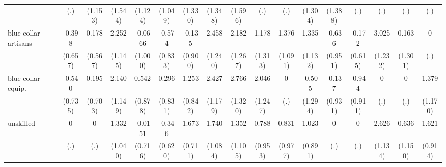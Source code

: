 {\begin{tabular}{l*{16}{c}}
                    &         (.)         &     (1.153)         &     (1.544)         &     (1.124)         &     (1.049)         &     (1.330)         &     (1.348)         &     (1.596)         &         (.)         &         (.)         &     (1.304)         &     (1.388)         &         (.)         &         (.)         &         (.)         &         (.)         \\
[1em]
blue collar - artisans&      -0.398         &       0.178         &       2.252\sym{*}  &     -0.0666         &      -0.574         &      -0.135         &       2.458\sym{*}  &       2.182         &       1.178         &       1.376         &       1.335         &      -0.636         &      -0.172         &       3.025\sym{*}  &       0.163         &           0         \\
                    &     (0.657)         &     (0.567)         &     (1.145)         &     (1.000)         &     (0.833)         &     (0.900)         &     (1.240)         &     (1.267)         &     (1.313)         &     (1.091)         &     (1.132)         &     (0.951)         &     (0.615)         &     (1.232)         &     (1.301)         &         (.)         \\
[1em]
blue collar - equip.&      -0.540         &       0.195         &       2.140         &       0.542         &       0.296         &       1.253         &       2.427\sym{*}  &       2.766\sym{*}  &       2.046         &           0         &      -0.505         &      -0.137         &      -0.944         &           0         &           0         &       1.379         \\
                    &     (0.735)         &     (0.703)         &     (1.149)         &     (0.878)         &     (0.831)         &     (0.842)         &     (1.179)         &     (1.320)         &     (1.247)         &         (.)         &     (1.294)         &     (0.931)         &     (0.911)         &         (.)         &         (.)         &     (1.170)         \\
[1em]
unskilled           &           0         &           0         &       1.332         &     -0.0151         &      -0.346         &       1.673\sym{*}  &       1.740         &       1.352         &       0.788         &       0.831         &       1.023         &           0         &           0         &       2.626\sym{*}  &       0.636         &       1.621         \\
                    &         (.)         &         (.)         &     (1.040)         &     (0.716)         &     (0.620)         &     (0.711)         &     (1.084)         &     (1.105)         &     (0.953)         &     (0.977)         &     (0.891)         &         (.)         &         (.)         &     (1.134)         &     (1.150)         &     (0.914)         \\

\end{tabular}}
